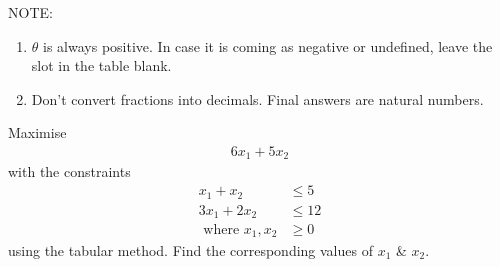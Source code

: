 \documentclass[journal,12pt,twocolumn]{IEEEtran}
\begin{document}
NOTE:
\begin{enumerate}
\item $\theta$ is always positive. In case it is coming as negative or undefined, leave the slot in the table blank.
\item Don't convert fractions into decimals. Final answers are natural numbers.
\end{enumerate}
\begin{problem}
Maximise
\begin{align}
6x_1 + 5x_2 \nonumber
\end{align}
with the constraints 
\begin{align}
x_1 + x_2 &\leq 5 \nonumber \\
3x_1 + 2x_2 &\leq 12 \nonumber \\
\text{ where } x_1,x_2 &\geq 0 \nonumber
\end{align}
using the tabular method. Find the corresponding values of $x_1$ \& $x_2$. 

\end{problem}
\end{document}
